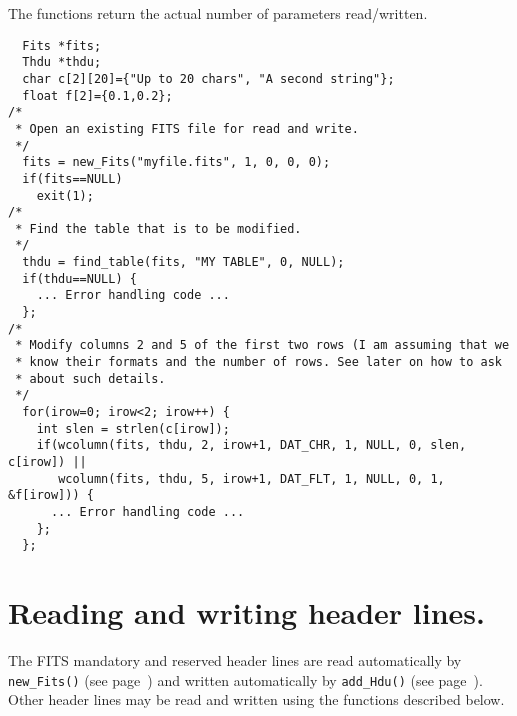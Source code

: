 The functions return the actual number of parameters read/written.

\begin{verbatim}
  Fits *fits;
  Thdu *thdu;
  char c[2][20]={"Up to 20 chars", "A second string"};
  float f[2]={0.1,0.2};
/*
 * Open an existing FITS file for read and write.
 */
  fits = new_Fits("myfile.fits", 1, 0, 0, 0);
  if(fits==NULL)
    exit(1);
/*
 * Find the table that is to be modified.
 */
  thdu = find_table(fits, "MY TABLE", 0, NULL);
  if(thdu==NULL) {
    ... Error handling code ...
  };
/*
 * Modify columns 2 and 5 of the first two rows (I am assuming that we
 * know their formats and the number of rows. See later on how to ask
 * about such details.
 */
  for(irow=0; irow<2; irow++) {
    int slen = strlen(c[irow]);
    if(wcolumn(fits, thdu, 2, irow+1, DAT_CHR, 1, NULL, 0, slen, c[irow]) ||
       wcolumn(fits, thdu, 5, irow+1, DAT_FLT, 1, NULL, 0, 1, &f[irow])) {
      ... Error handling code ...
    };
  };
\end{verbatim}

\section{Reading and writing header lines.}

The FITS mandatory and reserved header lines are read automatically by
\verb`new_Fits()` (see page~\pageref{new_Fits}) and written
automatically by \verb`add_Hdu()` (see page~\pageref{add_Hdu}).
Other header lines may be read and written using the functions
described below.

